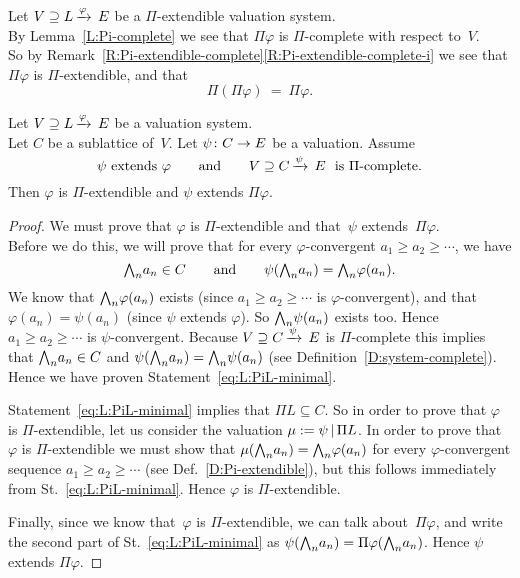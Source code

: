 %
%
\begin{rem}
\label{R:PiPiisPi}
Let $V \supseteq L\,\smash{\xrightarrow{\varphi}\,E}$ be a $\Pi$-extendible valuation system.\\
By Lemma~\ref{L:Pi-complete}
we see that $\Pi\varphi$
is $\Pi$-complete with respect to~$V$.\\
So by
Remark~\ref{R:Pi-extendible-complete}\ref{R:Pi-extendible-complete-i}
we see that $\Pi\varphi$
is $\Pi$-extendible, and that
\begin{equation*}
\Pi(\Pi\varphi) \ =\  \Pi\varphi.
\end{equation*}
\end{rem}
%
%
\begin{lem}
\label{L:Pi-minimal}
Let $V \supseteq L\,\smash{\xrightarrow{\varphi}\,E}$ be a valuation system.\\
Let $C$ be a sublattice of~$V$.
Let $\psi\colon C\rightarrow E$ be a valuation.
Assume
\begin{equation*}
\psi\text{ extends }\varphi
\qquad\text{and}\qquad
V \supseteq C\,\smash{\xrightarrow{\psi}\,E}\ \text{ is $\Pi$-complete.}
\end{equation*}
Then $\varphi$ is $\Pi$-extendible and
$\psi$ extends $\Pi\varphi$.
\end{lem}
\begin{proof}
We must prove that $\varphi$
is $\Pi$-extendible
and that~$\psi$ extends~$\Pi\varphi$.\\
Before we do this,
we will prove that
for every $\varphi$-convergent $a_1 \geq a_2 \geq \dotsb$,
we have
\begin{equation}
\label{eq:L:PiL-minimal}
\textstyle{\bigwedge}_n a_n \in C\qquad\text{and}\qquad \psi (\textstyle{\bigwedge}_n a_n) = \textstyle{\bigwedge}_n \varphi(a_n).
\end{equation}
We know that $\textstyle{\bigwedge}_n \varphi (a_n)$ exists
(since $a_1 \geq a_2 \geq \dotsb$ is $\varphi$-convergent),
and that $\varphi(a_n)= \psi(a_n)$
(since $\psi$ extends $\varphi$).
So $\textstyle{\bigwedge}_n \psi(a_n)$ exists too.
Hence $a_1 \geq a_2 \geq \dotsb$ is $\psi$-convergent.
Because $V \supseteq C\,\smash{\xrightarrow{\psi}\,E}$ is $\Pi$-complete
this implies that $\textstyle{\bigwedge}_n a_n \in C$ and 
$\psi (\textstyle{\bigwedge}_n a_n) = \textstyle{\bigwedge}_n \psi(a_n)$
(see Definition~\ref{D:system-complete}).
Hence we have proven Statement~\eqref{eq:L:PiL-minimal}.

Statement~\eqref{eq:L:PiL-minimal} implies that $\Pi L \subseteq C$.
So in order to prove that $\varphi$
is $\Pi$-extendible,
let us consider the valuation $\mu := \psi \,|\,\Pi L$.
In order to prove that~$\varphi$
is $\Pi$-extendible
we must show that
$\mu(\textstyle{\bigwedge}_n a_n) = \textstyle{\bigwedge}_n \varphi(a_n)$
for every $\varphi$-convergent sequence $a_1 \geq a_2 \geq \dotsb$
(see Def.~\ref{D:Pi-extendible}),
but this follows immediately from St.~\eqref{eq:L:PiL-minimal}.
Hence $\varphi$ is $\Pi$-extendible.

Finally,
since we know that~$\varphi$ is $\Pi$-extendible,
we can talk about~$\Pi\varphi$,
and write the second part of
St.~\eqref{eq:L:PiL-minimal}
as $\psi(\textstyle{\bigwedge}_n a_n) = \Pi \varphi(\textstyle{\bigwedge}_n a_n)$.
Hence $\psi$ extends $\Pi\varphi$.
\end{proof}
